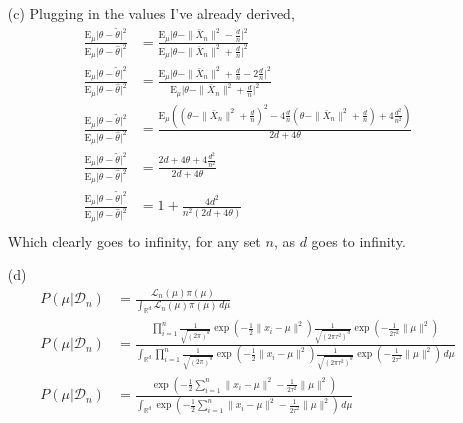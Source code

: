 \documentclass[11pt]{article}
\newcommand{\R}{\mathbb{R}}
\newcommand{\E}{\mathrm{E}}
\theoremstyle{definition}
\begin{document}
\begin{itemize}
\begin{itemize}
        \item[(c)]
            Plugging in the values I've already derived,
            \begin{align*}
                \frac{\E_\mu\vert \theta - \tilde \theta\vert^2}{\E_\mu\vert \theta - \hat \theta\vert^2} &= \frac{\E_\mu\vert \theta - \|\bar X_n\|^2 - \frac{d}{n}\vert^2}{\E_\mu\vert \theta - \|\bar X_n\|^2 + \frac{d}{n}\vert^2} \\ 
                \frac{\E_\mu\vert \theta - \tilde \theta\vert^2}{\E_\mu\vert \theta - \hat \theta\vert^2} &= \frac{\E_\mu\vert \theta - \|\bar X_n\|^2 + \frac{d}{n} - 2\frac{d}{n}\vert^2}{\E_\mu\vert \theta - \|\bar X_n\|^2 + \frac{d}{n}\vert^2} \\
                \frac{\E_\mu\vert \theta - \tilde \theta\vert^2}{\E_\mu\vert \theta - \hat \theta\vert^2} &= \frac{\E_\mu\left((\theta - \|\bar X_n\|^2 + \frac{d}{n})^2 - 4\frac{d}{n}(\theta - \|\bar X_n\|^2 + \frac{d}{n})+4\frac{d^2}{n^2}\right)}{2d+4\theta} \\
                \frac{\E_\mu\vert \theta - \tilde \theta\vert^2}{\E_\mu\vert \theta - \hat \theta\vert^2} &= \frac{2d+4\theta+4\frac{d^2}{n^2}}{2d+4\theta} \\
                \frac{\E_\mu\vert \theta - \tilde \theta\vert^2}{\E_\mu\vert \theta - \hat \theta\vert^2} &= 1+\frac{4d^2}{n^2(2d+4\theta)} \\
            \end{align*}
            Which clearly goes to infinity, for any set $n$, as $d$ goes to infinity.
        \item[(d)]
                \begin{align*}
                    P(\mu \vert \mathcal{D}_n) &= \frac{\mathcal{L}_n(\mu) \pi(\mu)}{\int_{\R^d}\mathcal{L}_n(\mu) \pi(\mu) \, d\mu} \\
                    P(\mu \vert \mathcal{D}_n) &= \frac{\prod_{i=1}^n \frac{1}{\sqrt{(2\pi)^d}}\exp\left(-\frac{1}{2}\|x_i-\mu\|^2\right)\frac{1}{\sqrt{(2\pi\tau^2)^d}}\exp\left(-\frac{1}{2\tau^2}\|\mu\|^2\right)}{\int_{\R^d}\prod_{i=1}^n\frac{1}{\sqrt{(2\pi)^d}} \exp\left(-\frac{1}{2}\|x_i-\mu\|^2\right) \frac{1}{\sqrt{(2\pi\tau^2)^d}}\exp\left(-\frac{1}{2\tau^2}\|\mu\|^2\right)\, d\mu}  \\
                    P(\mu \vert \mathcal{D}_n) &= \frac{ \exp\left(-\frac{1}{2}\sum_{i=1}^n\|x_i-\mu\|^2-\frac{1}{2\tau^2}\|\mu\|^2\right)}{\int_{\R^d}\exp\left(-\frac{1}{2}\sum_{i=1}^n\|x_i-\mu\|^2-\frac{1}{2\tau^2}\|\mu\|^2\right) \, d\mu}  \\

\end{align*}
\end{itemize}
\end{itemize}
\end{document}
